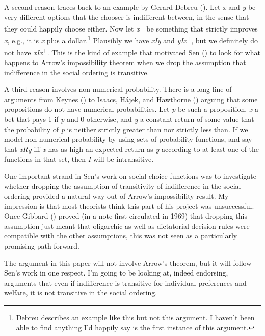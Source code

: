 \documentclass[
  11pt,
  letterpaper,
  DIV=11,
  numbers=noendperiod,
  twoside]{scrartcl}
\begin{document}
A second reason traces back to an example by Gerard Debreu
(). Let \emph{x} and \emph{y} be very
different options that the chooser is indifferent between, in the sense
that they could happily choose either. Now let
\emph{x}\textsuperscript{+} be something that strictly improves
\emph{x}, e.g., it is \emph{x} plus a dollar.\footnote{Debreu describes
  an example like this but not this argument. I haven't been able to
  find anything I'd happily say is the first instance of this argument.}
Plausibly we have \emph{xIy} and \emph{yIx}\textsuperscript{+}, but we
definitely do not have \emph{xIx}\textsuperscript{+}. This is the kind
of example that motivated Sen () to look for what happens to Arrow's impossibility theorem when we
drop the assumption that indifference in the social ordering is
transitive.

A third reason involves non-numerical probability. There is a long line
of arguments from Keynes () to Isaacs,
Hájek, and Hawthorne () arguing that some
propositions do not have numerical probabilities. Let \emph{p} be such a
proposition, \emph{x} a bet that pays 1 if \emph{p} and 0 otherwise, and
\emph{y} a constant return of some value that the probability of
\emph{p} is neither strictly greater than nor strictly less than. If we
model non-numerical probability by using sets of probability functions,
and say that \emph{xRy} iff \emph{x} has as high an expected return as
\emph{y} according to at least one of the functions in that set, then
\emph{I} will be intransitive.

One important strand in Sen's work on social choice functions was to
investigate whether dropping the assumption of transitivity of
indifference in the social ordering provided a natural way out of
Arrow's impossibility result. My impression is that most theorists think
this part of his project was unsuccessful. Once Gibbard
() proved (in a note first circulated in
1969) that dropping this assumption just meant that oligarchic as well
as dictatorial decision rules were compatible with the other
assumptions, this was not seen as a particularly promising path forward.

The argument in this paper will not involve Arrow's theorem, but it will
follow Sen's work in one respect. I'm going to be looking at, indeed
endorsing, arguments that even if indifference is transitive for
individual preferences and welfare, it is not transitive in the social
ordering.
\end{document}
